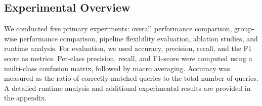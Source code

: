 \subsection{Experimental Overview}
\vspace{-4pt}
We conducted five primary experiments: overall performance comparison, group-wise performance comparison, pipeline flexibility evaluation, ablation studies, and runtime analysis. For evaluation, we used accuracy, precision, recall, and the F1 score as metrics. Per-class precision, recall, and F1-score were computed using a multi-class confusion matrix, followed by macro averaging. Accuracy was measured as the ratio of correctly matched queries to the total number of queries. A detailed runtime analysis and additional experimental results are provided in the appendix.




